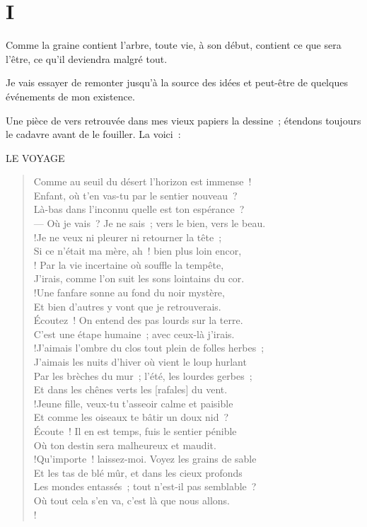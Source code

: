 \documentclass[french,twoside]{book} %
\newcommand\corr[1]{#1}
\newenvironment{quoteblock}%
  {\begin{quoting}}
  {\end{quoting}}
\newcommand\chapteropen{} %
\newcommand\chaptercont{} %
\newenvironment{quotebar}{%
    \def\FrameCommand{{\color{rubric!10!}\vrule width 0.5em} \hspace{0.9em}}%
    \def\OuterFrameSep{\itemsep} %
    \MakeFramed {\advance\hsize-\width \FrameRestore}
  }%
  {%
    \endMakeFramed
  }
\renewenvironment{quoteblock}%
  {%
    \savenotes
    \setstretch{0.9}
    \normalfont
    \begin{quotebar}
  }
  {%
    \end{quotebar}
    \spewnotes
  }
\begin{document}
\chaptercont

\chapteropen
\chapter[{I}]{I}
\label{p2.1}

\chaptercont
\noindent Comme la graine contient l’arbre, toute vie, à son début, contient ce que sera l’être, ce qu’il deviendra malgré tout.\par
Je vais essayer de remonter jusqu’à la source des idées et peut-être de quelques événements de mon existence.\par
Une pièce de vers retrouvée dans mes vieux papiers la dessine ; étendons toujours le cadavre avant de le fouiller. La voici :\par

\begin{quoteblock}
LE VOYAGE\end{quoteblock}

\begin{verse}
Comme au seuil du désert l’horizon est immense !\\
Enfant, où t’en vas-tu par le sentier nouveau ?\\
Là-bas dans l’inconnu quelle est ton espérance ?\\
— Où je vais ? Je ne sais ; vers le bien, vers le beau.\\!Je ne veux ni pleurer ni retourner la tête ;\\
Si ce n’était ma mère, ah ! bien plus loin encor,\\! Par la vie incertaine où souffle la tempête,\\
J’irais, comme l’on suit les sons lointains du cor.\\!Une fanfare sonne au fond du noir mystère,\\
Et bien d’autres y vont que je retrouverais.\\
Écoutez ! On entend des pas lourds sur la terre.\\
C’est une étape humaine ; avec ceux-là j’irais.\\!J’aimais l’ombre du clos tout plein de folles herbes ;\\
J’aimais les nuits d’hiver où vient le loup hurlant\\
Par les brèches du mur ; l’été, les lourdes gerbes ;\\
Et dans les chênes verts les [{\corr rafales}] du vent.\\!Jeune fille, veux-tu t’asseoir calme et paisible\\
Et comme les oiseaux te bâtir un doux nid ?\\
Écoute ! Il en est temps, fuis le sentier pénible\\
Où ton destin sera malheureux et maudit.\\!Qu’importe ! laissez-moi. Voyez les grains de sable\\
Et les tas de blé mûr, et dans les cieux profonds\\
Les mondes entassés ; tout n’est-il pas semblable ?\\
Où tout cela s’en va, c’est là que nous allons.\\!
\end{verse}
\end{document}
